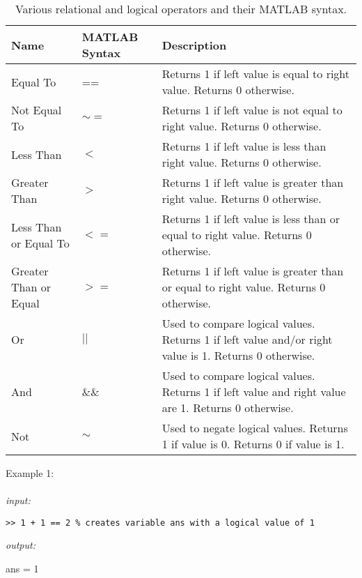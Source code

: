 \documentclass[../MATLAB_Primer.tex]{subfiles}
\begin{document}
\begin{table}[H]
\caption{Various relational and logical operators and their MATLAB syntax.}
\begin{center}
\begin{tabular}{| C{3cm} | C{2cm} | m{8cm}|}
    \hline
    \textbf{Name} & \textbf{MATLAB Syntax} & \textbf{Description}\\
    \hline
    Equal To & == & Returns 1 if left value is equal to right value. Returns 0 otherwise.\\
    \hline
    Not Equal To & $\sim =$ & Returns 1 if left value is not equal to right value. Returns 0 otherwise.\\ 
    \hline
    Less Than & $<$ & Returns 1 if left value is less than right value. Returns 0 otherwise.\\
    \hline
    Greater Than & $>$ & Returns 1 if left value is greater than right value. Returns 0 otherwise.\\
    \hline
    Less Than or Equal To & $<=$ & Returns 1 if left value is less than or equal to right value. Returns 0 otherwise.\\
    \hline
    Greater Than or Equal  & $>=$ & Returns 1 if left value is greater than or equal to right value. Returns 0 otherwise.\\
    \hline
    Or & $||$ &  Used to compare logical values. Returns 1 if left value and/or right value is 1. Returns 0 otherwise.\\
    \hline
    And & $\&\&$ & Used to compare logical values. Returns 1 if left value and right value are 1. Returns 0 otherwise.\\
    \hline
    Not & $\sim$ & Used to negate logical values. Returns 1 if value is 0. Returns 0 if value is 1.\\
    \hline
    \end{tabular}
    \label{tab:Logic}
\end{center}
\end{table}

Example 1:
\\ \\
\textit{input:}
\begin{lstlisting}[frame=single]
>> 1 + 1 == 2 % creates variable ans with a logical value of 1
\end{lstlisting}

\textit{output:}

\begin{center}
    ans = 1
\end{center}
\end{document}
